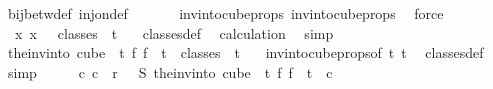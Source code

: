 \begin{isabellebody}
\ bij{\isacharunderscore}{\kern0pt}betw{\isacharunderscore}{\kern0pt}def\ inj{\isacharunderscore}{\kern0pt}on{\isacharunderscore}{\kern0pt}def\ \isanewline
\ \ \ \ \isamarkupfalse%
\ inv{\isacharunderscore}{\kern0pt}into{\isacharunderscore}{\kern0pt}cube{\isacharunderscore}{\kern0pt}props{\isacharparenleft}{\kern0pt}{}{\isacharparenright}{\kern0pt}\ inv{\isacharunderscore}{\kern0pt}into{\isacharunderscore}{\kern0pt}cube{\isacharunderscore}{\kern0pt}props{\isacharparenleft}{\kern0pt}{}{\isacharparenright}{\kern0pt}\ \isamarkupfalse%
\ force\ \isanewline
\ \ \isamarkupfalse%
\ \isamarkupfalse%
\ {\isacharasterisk}{\kern0pt}{\isacharasterisk}{\kern0pt}{\isacharcolon}{\kern0pt}\ {\isachardoublequoteopen}{\isasymexists}{\isacharbang}{\kern0pt}x{\isachardot}{\kern0pt}\ x\ \ {\isasymin}\ classes\ {}\ t\ {}{\isachardoublequoteclose}\ \isamarkupfalse%
\ classes{\isacharunderscore}{\kern0pt}def\ \isamarkupfalse%
\ calculation{\isacharparenleft}{\kern0pt}{}{\isacharparenright}{\kern0pt}\ \isamarkupfalse%
\ simp\isanewline
\ \ \isamarkupfalse%
\ \isamarkupfalse%
\ {\isachardoublequoteopen}the{\isacharunderscore}{\kern0pt}inv{\isacharunderscore}{\kern0pt}into\ {\isacharparenleft}{\kern0pt}cube\ {}\ {\isacharparenleft}{\kern0pt}t{\isacharplus}{\kern0pt}{}{\isacharparenright}{\kern0pt}{\isacharparenright}{\kern0pt}\ {\isacharparenleft}{\kern0pt}{\isasymlambda}f{\isachardot}{\kern0pt}\ f\ {}{\isacharparenright}{\kern0pt}\ t\ {\isasymin}\ classes\ {}\ t\ {}{\isachardoublequoteclose}\ \isamarkupfalse%
\ inv{\isacharunderscore}{\kern0pt}into{\isacharunderscore}{\kern0pt}cube{\isacharunderscore}{\kern0pt}props{\isacharbrackleft}{\kern0pt}of\ t\ {\isachardoublequoteopen}t{\isacharplus}{\kern0pt}{}{\isachardoublequoteclose}{\isacharbrackright}{\kern0pt}\ \isamarkupfalse%
\ classes{\isacharunderscore}{\kern0pt}def\ \isamarkupfalse%
\ simp\isanewline
\isanewline
\ \ \isamarkupfalse%
\ \isamarkupfalse%
\ {\isachardoublequoteopen}{\isasymexists}c{}{\isachardot}{\kern0pt}\ c{}\ {\isacharless}{\kern0pt}\ r\ {\isasymand}\ {\isasymchi}\ {\isacharparenleft}{\kern0pt}S\ {\isacharparenleft}{\kern0pt}the{\isacharunderscore}{\kern0pt}inv{\isacharunderscore}{\kern0pt}into\ {\isacharparenleft}{\kern0pt}cube\ {}\ {\isacharparenleft}{\kern0pt}t{\isacharplus}{\kern0pt}{}{\isacharparenright}{\kern0pt}{\isacharparenright}{\kern0pt}\ {\isacharparenleft}{\kern0pt}{\isasymlambda}f{\isachardot}{\kern0pt}\ f\ {}{\isacharparenright}{\kern0pt}\ t{\isacharparenright}{\kern0pt}{\isacharparenright}{\kern0pt}\ {\isacharequal}{\kern0pt}\ c{}{\isachardoublequoteclose}\ \isamarkupfalse%

\end{isabellebody}
